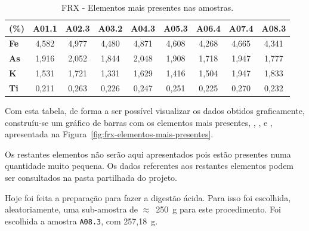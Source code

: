\begin{table}[!ht]
    \caption{FRX - Elementos mais presentes nas amostras.}
    \label{tab:frx-elementos-mais-presentes}
    \begin{tabularx}{\textwidth}{@{}lCCCCCCCC@{}}
        \toprule
        \textbf{(\%)} & \textbf{A01.1} & \textbf{A02.3} & \textbf{A03.2} & \textbf{A04.3} & \textbf{A05.3} & \textbf{A06.4} & \textbf{A07.4} & \textbf{A08.3} \\ \midrule
        \textbf{Fe} & 4,582 & 4,977 & 4,480 & 4,871 & 4,608 & 4,268 & 4,665 & 4,341 \\
        \textbf{As} & 1,916 & 2,052 & 1,844 & 2,048 & 1,908 & 1,718 & 1,947 & 1,777 \\
        \textbf{K} & 1,531 & 1,721 & 1,331 & 1,629 & 1,416 & 1,504 & 1,947 & 1,833 \\
        \textbf{Ti} & 0,211 & 0,263 & 0,226 & 0,247 & 0,251 & 0,225 & 0,270 & 0,232 \\ \bottomrule
    \end{tabularx}
\end{table}

\newpara

Com esta tabela, de forma a ser possível visualizar os dados obtidos graficamente, construíu-se um gráfico de barras com os elementos mais presentes, , ,  e , apresentada na Figura~\ref{fig:frx-elementos-mais-presentes}.

Os restantes elementos não serão aqui apresentados pois estão presentes numa quantidade muito pequena.
Os dados referentes aos restantes elementos podem ser consultados na pasta partilhada do projeto.

\newpage



\hrulefill


\label{day:7-novembro-2024}

Hoje foi feita a preparação para fazer a digestão ácida.
Para isso foi escolhida, aleatoriamente, uma sub-amostra de $\approx$~250~g para este procedimento.
Foi escolhida a amostra \texttt{A08.3}, com 257,18~g.

